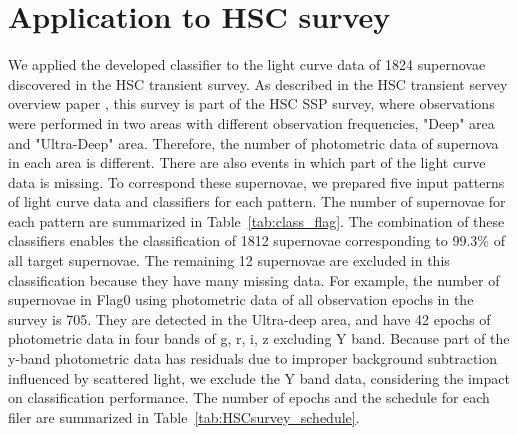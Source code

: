 \documentclass[useamsfonts]{pasj01}
\begin{document}
\section{Application to HSC survey}
%
We applied the developed classifier to the light curve data of 1824 supernovae discovered in the HSC transient survey.
As described in the HSC transient servey overview paper \citep{yasuda19a}, this survey is part of the HSC SSP survey, where observations were performed in two areas with different observation frequencies, "Deep" area and "Ultra-Deep" area.
Therefore, the number of photometric data of supernova in each area is different.
There are also events in which part of the light curve data is missing.
To correspond these supernovae, we prepared five input patterns of light curve data and classifiers for each pattern.
The number of supernovae for each pattern are summarized in Table\ \ref{tab:class_flag}.
The combination of these classifiers enables the classification of 1812 supernovae corresponding to 99.3\% of all target supernovae.
The remaining 12 supernovae are excluded in this classification because they have many missing data.
For example, the number of supernovae in Flag0 using photometric data of all observation epochs in the survey is 705.
They are detected in the Ultra-deep area, and have 42 epochs of photometric data in four bands of g, r, i, z excluding Y band.
Because part of the y-band photometric data has residuals due to improper background subtraction influenced by scattered light,
we exclude the Y band data, considering the impact on classification performance.
The number of epochs and the schedule for each filer are summarized in Table\ \ref{tab:HSCsurvey_schedule}.
%
\begin{table}[ht]
\label{tab:class_flag}
\end{table}
\end{document}
